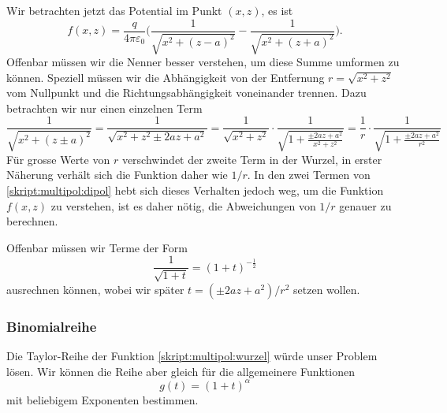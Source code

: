 Wir betrachten jetzt das Potential im Punkt $(x,z)$, es ist
\begin{equation}
f(x,z)
=
\frac{q}{4\pi\varepsilon_0}
\biggl(
\frac{1}{\sqrt{x^2 + (z-a)^2}}
-
\frac{1}{\sqrt{x^2 + (z+a)^2}}
\biggr).
\label{skript:multipol:dipol}
\end{equation}
Offenbar müssen wir die Nenner besser verstehen, um diese Summe 
umformen zu können.
Speziell müssen wir die Abhängigkeit von der Entfernung
$r=\sqrt{x^2+z^2}$ vom Nullpunkt
und die Richtungsabhängigkeit voneinander trennen.
Dazu betrachten wir nur einen einzelnen Term
\[
\frac{1}{\sqrt{x^2+(z\pm a)^2}}
=
\frac{1}{\sqrt{x^2+z^2\pm 2az+a^2}}
=
\frac{1}{\sqrt{x^2+z^2}} \cdot \frac{1}{\sqrt{\displaystyle 1+\frac{\pm 2az+a^2}{x^2+z^2}}}
=
\frac{1}{r} \cdot \frac{1}{\sqrt{\displaystyle 1+\frac{\pm 2az+a^2}{r^2}}}
\]
Für grosse Werte von $r$ verschwindet der zweite Term in der Wurzel,
in erster Näherung verhält sich die Funktion daher wie $1/r$.
In den zwei Termen von \eqref{skript:multipol:dipol} hebt sich dieses
Verhalten jedoch weg, um die Funktion $f(x,z)$ zu verstehen, ist es
daher nötig, die Abweichungen von $1/r$ genauer zu berechnen.

Offenbar müssen wir Terme der Form
\begin{equation}
\frac{1}{\sqrt{1+t}}
=
(1+t)^{-\frac12}
\label{skript:multipol:wurzel}
\end{equation}
ausrechnen können, wobei wir später $t=(\pm2az+a^2)/r^2$ setzen wollen.

\subsubsection{Binomialreihe%
\label{skript:multipol:binomialreihe}}
Die Taylor-Reihe der Funktion \eqref{skript:multipol:wurzel}
würde unser Problem lösen. 
Wir können die Reihe aber gleich für die
allgemeinere Funktionen
\begin{equation}
g(t)=(1+t)^\alpha
\end{equation}
mit beliebigem Exponenten bestimmen.

